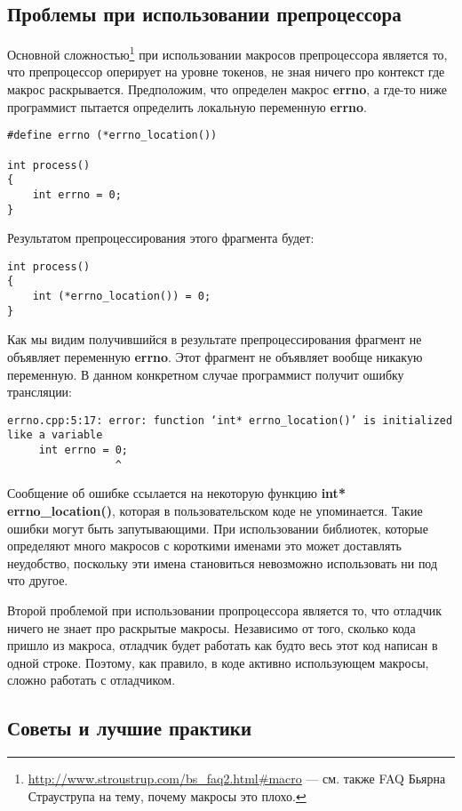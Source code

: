 \subsection{Проблемы при использовании препроцессора}
Основной сложностью\footnote{\url{http://www.stroustrup.com/bs_faq2.html\#macro} --- см. также FAQ Бьярна Страуструпа на тему, почему макросы это плохо.} при использовании макросов препроцессора является то, что препроцессор оперирует на уровне токенов, не зная ничего про контекст где макрос раскрывается. Предположим, что определен макрос {\bf errno}, а где-то ниже программист пытается определить локальную переменную {\bf errno}.
\begin{verbatim}
#define errno (*errno_location())

int process()
{
    int errno = 0;
}
\end{verbatim}
Результатом препроцессирования этого фрагмента будет:
\begin{verbatim}
int process()
{
    int (*errno_location()) = 0;
}
\end{verbatim}
Как мы видим получившийся в результате препроцессирования фрагмент не объявляет переменную {\bf errno}. Этот фрагмент не объявляет вообще никакую переменную. В данном конкретном случае программист получит ошибку трансляции:
\begin{verbatim}
errno.cpp:5:17: error: function ‘int* errno_location()’ is initialized like a variable
     int errno = 0;
                 ^
\end{verbatim}
Сообщение об ошибке ссылается на некоторую функцию {\bf int* errno\_location()}, которая в пользовательском коде не упоминается. Такие ошибки могут быть запутывающими. При использовании библиотек, которые определяют много макросов с короткими именами это может доставлять неудобство, поскольку эти имена становиться невозможно использовать ни под что другое.

Второй проблемой при использовании пропроцессора является то, что отладчик ничего не знает про раскрытые макросы. Независимо от того, сколько кода пришло из макроса, отладчик будет работать как будто весь этот код написан в одной строке. Поэтому, как правило, в коде активно использующем макросы, сложно работать с отладчиком.

\subsection{Советы и лучшие практики}
